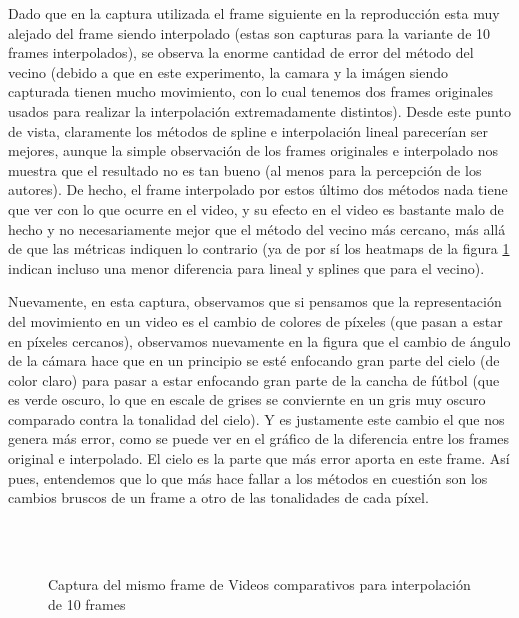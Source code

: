 \par Dado que en la captura utilizada el frame siguiente en la reproducci\'on
esta muy alejado del frame siendo interpolado (estas son capturas para la
variante de 10 frames interpolados), se observa la enorme cantidad de error del
m\'etodo del vecino (debido a que en este experimento, la camara y la im\'agen
siendo capturada tienen mucho movimiento, con lo cual tenemos dos frames
originales usados para realizar la interpolaci\'on extremadamente distintos).
Desde este punto de vista, claramente los m\'etodos de spline e interpolaci\'on
lineal parecer\'ian ser mejores, aunque la simple observaci\'on de los frames
originales e interpolado nos muestra que el resultado no es tan bueno (al menos
para la percepci\'on de los autores). De hecho, el frame interpolado por estos
\'ultimo dos m\'etodos nada tiene que ver con lo que ocurre en el video, y su
efecto en el video es bastante malo de hecho y no necesariamente mejor que el
m\'etodo del vecino m\'as cercano, m\'as allá de que las m\'etricas indiquen lo
contrario (ya de por s\'i los heatmaps de la figura
\ref{fig:movil-movil_heatmap} indican incluso una menor diferencia para lineal
y splines que para el vecino).

\par Nuevamente, en esta captura, observamos que si pensamos que la
representaci\'on del movimiento en un video es el cambio de colores de
p\'ixeles (que pasan a estar en p\'ixeles cercanos), observamos nuevamente en
la figura que el cambio de \'angulo de la c\'amara hace que en un principio se
est\'e enfocando gran parte del cielo (de color claro) para pasar a estar
enfocando gran parte de la cancha de f\'utbol (que es verde oscuro, lo que en
escale de grises se conviernte en un gris muy oscuro comparado contra la
tonalidad del cielo). Y es justamente este cambio el que nos genera m\'as
error, como se puede ver en el gr\'afico de la diferencia entre los frames
original e interpolado. El cielo es la parte que m\'as error aporta en este
frame. As\'i pues, entendemos que lo que m\'as hace fallar a los m\'etodos en
cuesti\'on son los cambios bruscos de un frame a otro de las tonalidades de
cada p\'ixel.

\begin{figure}[H]
    \centering
    \\
    \\
    \caption{Captura del mismo frame de Videos comparativos para interpolaci\'on de 10 frames}
    \label{fig:movil-movil_heatmap}
\end{figure}

